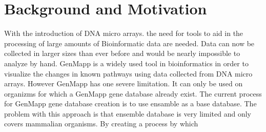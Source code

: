 \section{Background and Motivation}
With the introduction of DNA micro arrays.  the need for tools to aid in the processing of large amounts of Bioinformatic data are needed.  Data can now be collected in larger sizes than ever before and would be nearly impossible to analyze by hand.  GenMapp is a widely used tool in bioinformatics in order to visualize the changes in known pathways using data collected from DNA micro arrays.  However GenMapp has one severe  limitation.  It can only be used on organizms for which a GenMapp gene database already exist.  The current process for GenMapp gene database creation is to use ensamble as a base database.   The problem with this approach is that ensemble database is very limited and only covers mammalian organisms.  By creating a process by which 
\cite{genmapp:ng} \cite{mappfinder:gb} \cite{genmapp:bax}